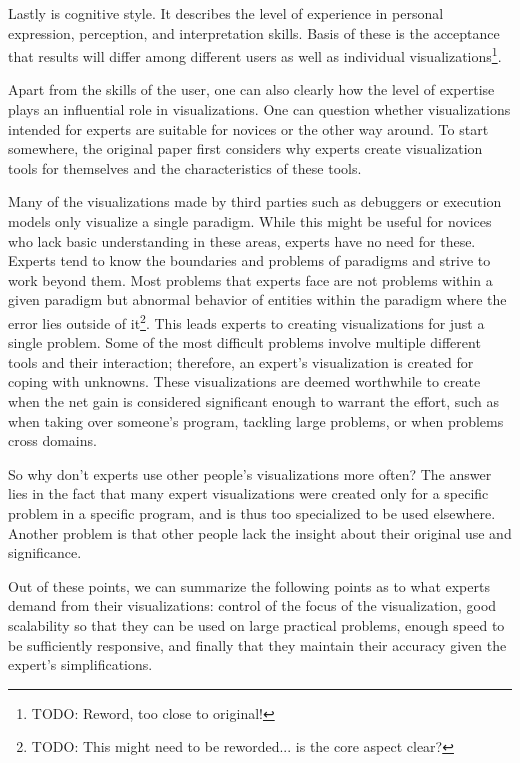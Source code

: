 \documentclass[11pt, a4paper, ngerman, twoside]{article}
\theoremstyle{plain}\newtheorem{Lemma}{Lemma}
\theoremstyle{plain}\newtheorem{Satz}[Lemma]{Satz}
\theoremstyle{definition}\newtheorem{Definition}[Lemma]{Definition}
\theoremstyle{definition}\newtheorem*{Beispiel}{Beispiel}
\theoremstyle{remark}\newtheorem*{Bemerkung}{Bemerkung}
\begin{document}
Lastly is cognitive style. It describes the level of experience in personal expression, perception, and interpretation skills. Basis of these is the acceptance that results will differ among different users as well as individual visualizations\footnote{TODO: Reword, too close to original!}.

Apart from the skills of the user, one can also clearly how the level of expertise plays an influential role in visualizations. One can question whether visualizations intended for experts are suitable for novices or the other way around. To start somewhere, the original paper first considers why experts create visualization tools for themselves and the characteristics of these tools.

Many of the visualizations made by third parties such as debuggers or execution models only visualize a single paradigm. While this might be useful for novices who lack basic understanding in these areas, experts have no need for these. Experts tend to know the boundaries and problems of paradigms and strive to work beyond them. Most problems that experts face are not problems within a given paradigm but abnormal behavior of entities within the paradigm where the error lies outside of it\footnote{TODO: This might need to be reworded... is the core aspect clear?}. This leads experts to creating visualizations for just a single problem. Some of the most difficult problems involve multiple different tools and their interaction; therefore, an expert's visualization is created for coping with unknowns. These visualizations are deemed worthwhile to create when the net gain is considered significant enough to warrant the effort, such as when taking over someone's program, tackling large problems, or when problems cross domains.

So why don't experts use other people's visualizations more often? The answer lies in the fact that many expert visualizations were created only for a specific problem in a specific program, and is thus too specialized to be used elsewhere. Another problem is that other people lack the insight about their original use and significance.

Out of these points, we can summarize the following points as to what experts demand from their visualizations: control of the focus of the visualization, good scalability so that they can be used on large practical problems, enough speed to be sufficiently responsive, and finally that they maintain their accuracy given the expert's simplifications.
\end{document}
